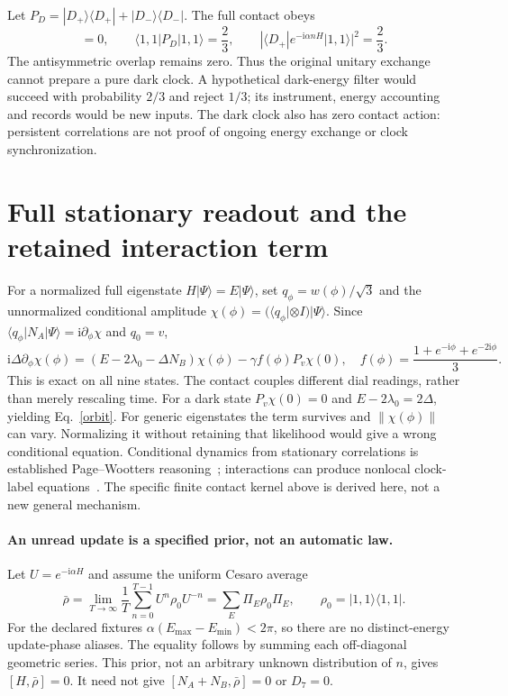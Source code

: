 \documentclass[11pt,a4paper]{article}
\newcommand{\ii}{\mathrm i}
\newcommand{\ket}[1]{|#1\rangle}
\newcommand{\bra}[1]{\langle#1|}
\begin{document}
Let $P_D=\ket{D_+}\bra{D_+}+\ket{D_-}\bra{D_-}$. The full contact obeys
\begin{equation}
 [H,P_D]=0,\qquad\bra{1,1}P_D\ket{1,1}=\frac23,\qquad
 |\bra{D_+}e^{-\ii\alpha nH}\ket{1,1}|^2=\frac23.\label{prep}
\end{equation}
The antisymmetric overlap remains zero. Thus the original unitary
exchange cannot prepare a pure dark clock. A hypothetical dark-energy
filter would succeed with probability $2/3$ and reject $1/3$; its
instrument, energy accounting and records would be new inputs.
The dark clock also has zero contact action: persistent correlations
are not proof of ongoing energy exchange or clock synchronization.

\newpage
\section{Full stationary readout and the retained interaction term}
For a normalized full eigenstate $H\ket\Psi=E\ket\Psi$, set
$q_\phi=w(\phi)/\sqrt3$ and the unnormalized conditional amplitude
$\chi(\phi)=(\bra{q_\phi}\otimes I)\ket\Psi$. Since
$\bra{q_\phi}N_A\ket\Psi=\ii\partial_\phi\chi$ and $q_0=v$,
\begin{equation}
 \ii\Delta\partial_\phi\chi(\phi)
 =(E-2\lambda_0-\Delta N_B)\chi(\phi)
 -\gamma f(\phi)P_v\chi(0),\quad
 f(\phi)=\frac{1+e^{-\ii\phi}+e^{-2\ii\phi}}3.\label{kernel}
\end{equation}
This is exact on all nine states. The contact couples different dial
readings, rather than merely rescaling time. For a dark state
$P_v\chi(0)=0$ and $E-2\lambda_0=2\Delta$, yielding Eq.~\eqref{orbit}.
For generic eigenstates the term survives and $\|\chi(\phi)\|$ can vary.
Normalizing it without retaining that likelihood would give a wrong
conditional equation. Conditional dynamics from stationary correlations
is established Page--Wootters reasoning~\cite{pw}; interactions can
produce nonlocal clock-label equations~\cite{smith}. The specific
finite contact kernel above is derived here, not a new general mechanism.

\paragraph{An unread update is a specified prior, not an automatic law.}
Let $U=e^{-\ii\alpha H}$ and assume the uniform Cesaro average
\begin{equation}
 \bar\rho=\lim_{T\to\infty}\frac1T\sum_{n=0}^{T-1}U^n\rho_0U^{-n}
 =\sum_E\Pi_E\rho_0\Pi_E,\qquad\rho_0=\ket{1,1}\bra{1,1}.\label{avg}
\end{equation}
For the declared fixtures $\alpha(E_{\max}-E_{\min})<2\pi$, so there
are no distinct-energy update-phase aliases. The equality follows
by summing each off-diagonal geometric series. This prior, not an
arbitrary unknown distribution of $n$, gives $[H,\bar\rho]=0$.
It need not give $[N_A+N_B,\bar\rho]=0$ or $D_7=0$.
\end{document}
